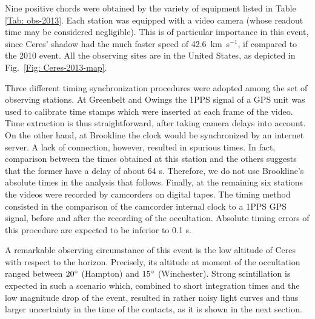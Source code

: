 \documentclass[useAMS,usenatbib]{mn2e}
\begin{document}
Nine positive chords were obtained by the variety of equipment listed in Table \ref{Tab: obs-2013}. Each station was equipped with a video camera (whose readout time may be considered negligible). This is of particular importance in this event, since Ceres' shadow had the much faster speed of 42.6~km~s$^{-1}$, if compared to the 2010 event. All the observing sites are in the United States, as depicted in Fig.~\ref{Fig: Ceres-2013-map}.

Three different timing synchronization procedures were adopted among the set of observing stations. At Greenbelt and Owings the 1PPS signal of a GPS unit was used to calibrate time stamps which were inserted at each frame of the video. Time extraction is thus straightforward, after taking camera delays into account. On the other hand, at Brookline the clock would be synchronized by an internet server. A lack of connection, however, resulted in spurious times. In fact, comparison between the times obtained at this station and the others suggests that the former have a delay of about 64 s. Therefore, we do not use Brookline's absolute times in the analysis that follows. Finally, at the remaining six stations the videos were recorded by camcorders on digital tapes. The timing method consisted in the comparison of the camcorder internal clock to a 1PPS GPS signal, before and after the recording of the occultation. Absolute timing errors of this procedure are expected to be inferior to 0.1 s.

A remarkable observing circumstance of this event is the low altitude of Ceres with respect to the horizon. Precisely, its altitude at moment of the occultation ranged between $20\hbox{$^\circ$}$ (Hampton) and $15\hbox{$^\circ$}$ (Winchester). Strong scintillation is expected in such a scenario which, combined to short integration times and the low magnitude drop of the event, resulted in rather noisy light curves and thus larger uncertainty in the time of the contacts, as it is shown in the next section.
\end{document}
